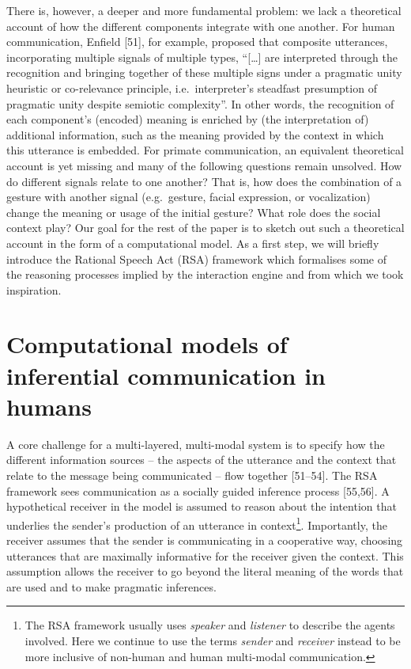 \documentclass[
  man,floatsintext]{apa6}
\begin{document}
There is, however, a deeper and more fundamental problem: we lack a theoretical account of how the different components integrate with one another. For human communication, Enfield {[}51{]}, for example, proposed that composite utterances, incorporating multiple signals of multiple types, ``{[}\ldots{]} are interpreted through the recognition and bringing together of these multiple signs under a pragmatic unity heuristic or co-relevance principle, i.e.~interpreter's steadfast presumption of pragmatic unity despite semiotic complexity''. In other words, the recognition of each component's (encoded) meaning is enriched by (the interpretation of) additional information, such as the meaning provided by the context in which this utterance is embedded. For primate communication, an equivalent theoretical account is yet missing and many of the following questions remain unsolved. How do different signals relate to one another? That is, how does the combination of a gesture with another signal (e.g.~gesture, facial expression, or vocalization) change the meaning or usage of the initial gesture? What role does the social context play? Our goal for the rest of the paper is to sketch out such a theoretical account in the form of a computational model. As a first step, we will briefly introduce the Rational Speech Act (RSA) framework which formalises some of the reasoning processes implied by the interaction engine and from which we took inspiration.

\hypertarget{computational-models-of-inferential-communication-in-humans}{%
\section{Computational models of inferential communication in humans}\label{computational-models-of-inferential-communication-in-humans}}

A core challenge for a multi-layered, multi-modal system is to specify how the different information sources -- the aspects of the utterance and the context that relate to the message being communicated -- flow together {[}51--54{]}. The RSA framework sees communication as a socially guided inference process {[}55,56{]}. A hypothetical receiver in the model is assumed to reason about the intention that underlies the sender's production of an utterance in context\footnote{The RSA framework usually uses \emph{speaker} and \emph{listener} to describe the agents involved. Here we continue to use the terms \emph{sender} and \emph{receiver} instead to be more inclusive of non-human and human multi-modal communication.}. Importantly, the receiver assumes that the sender is communicating in a cooperative way, choosing utterances that are maximally informative for the receiver given the context. This assumption allows the receiver to go beyond the literal meaning of the words that are used and to make pragmatic inferences.
\end{document}
